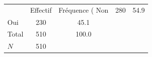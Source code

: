 {
\def\sym#1{\ifmmode^{#1}\else\(^{#1}\)\fi}
\begin{tabular}{l*{1}{cc}}
\toprule
            &    Effectif&Fréquence (%
\midrule
Non         &         280&        54.9\\
Oui         &         230&        45.1\\
Total       &         510&       100.0\\
\midrule
\(N\)       &         510&            \\
\bottomrule
\end{tabular}
}

